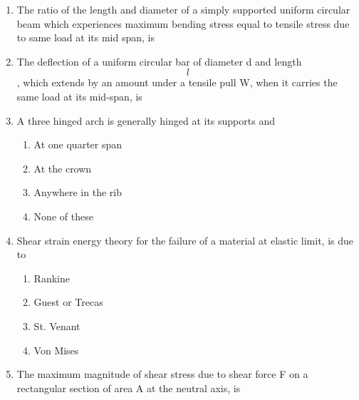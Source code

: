 \documentclass[11pt,a4paper]{article}
\begin{document}
\begin{enumerate}
\item{The ratio of the length and diameter of a simply supported uniform circular beam which experiences maximum bending stress equal to tensile stress due to same load at its mid span, is}
\\
\item{The deflection of a uniform circular bar of diameter d and length $$l$$, which extends by an amount under a tensile pull W, when it carries the same load at its mid-span, is}
\\
\item{A three hinged arch is generally hinged at its supports and}
\begin{enumerate}[label=\Alph*.]
\item{At one quarter span}
\item{At the crown}
\item{Anywhere in the rib}
\item{None of these}
\end{enumerate}
\item{Shear strain energy theory for the failure of a material at elastic limit, is due to}
\begin{enumerate}[label=\Alph*.]
\item{Rankine}
\item{Guest or Trecas}
\item{St. Venant}
\item{Von Mises}
\end{enumerate}
\item{The maximum magnitude of shear stress due to shear force F on a rectangular section of area A at the neutral axis, is}

\end{enumerate}
\end{document}
